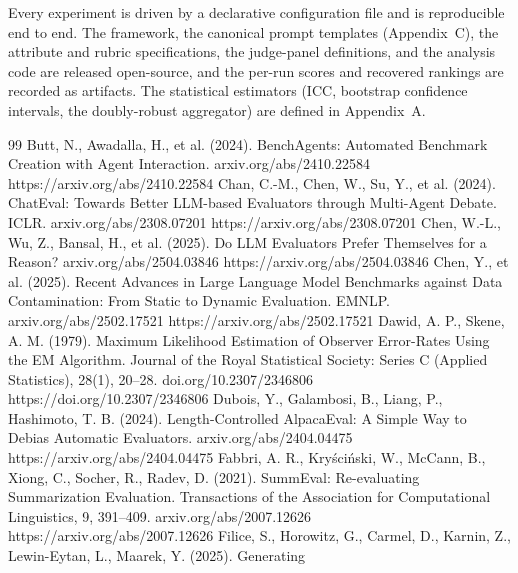 \documentclass[11pt,a4paper]{article}
\begin{document}
Every experiment is driven by a declarative configuration file and is reproducible end to end. The framework, the
canonical prompt templates (Appendix~C), the attribute and rubric specifications, the judge-panel definitions, and
the analysis code are released open-source, and the per-run scores and recovered rankings are recorded as artifacts. The
statistical estimators (ICC, bootstrap confidence intervals, the doubly-robust aggregator) are defined in
Appendix~A.



\begin{thebibliography}{99}
\setlength{\itemsep}{2pt plus 0.5pt}\setlength{\parsep}{0pt}
\label{r10} Butt, N., Awadalla, H., et al. (2024). BenchAgents: Automated Benchmark Creation with Agent
    Interaction. arxiv.org/abs/2410.22584 https://arxiv.org/abs/2410.22584
\label{r21} Chan, C.-M., Chen, W., Su, Y., et al. (2024). ChatEval: Towards Better LLM-based Evaluators through
    Multi-Agent Debate. ICLR. arxiv.org/abs/2308.07201 https://arxiv.org/abs/2308.07201
\label{r24} Chen, W.-L., Wu, Z., Bansal, H., et al. (2025). Do LLM Evaluators Prefer Themselves for a
    Reason? arxiv.org/abs/2504.03846 https://arxiv.org/abs/2504.03846
\label{r32} Chen, Y., et al. (2025). Recent Advances in Large Language Model Benchmarks against Data
    Contamination: From Static to Dynamic Evaluation. EMNLP. arxiv.org/abs/2502.17521 https://arxiv.org/abs/2502.17521
\label{r33} Dawid, A. P., Skene, A. M. (1979). Maximum Likelihood Estimation of Observer Error-Rates Using
    the EM Algorithm. Journal of the Royal Statistical Society: Series C (Applied Statistics), 28(1), 20–28. doi.org/10.2307/2346806 https://doi.org/10.2307/2346806
\label{r8} Dubois, Y., Galambosi, B., Liang, P., Hashimoto, T. B. (2024). Length-Controlled AlpacaEval: A Simple
    Way to Debias Automatic Evaluators. arxiv.org/abs/2404.04475 https://arxiv.org/abs/2404.04475
\label{r37} Fabbri, A. R., Kryściński, W., McCann, B., Xiong, C., Socher, R., Radev, D. (2021). SummEval: Re-evaluating Summarization Evaluation. Transactions of the Association for Computational
    Linguistics, 9, 391–409. arxiv.org/abs/2007.12626 https://arxiv.org/abs/2007.12626
\label{r31} Filice, S., Horowitz, G., Carmel, D., Karnin, Z., Lewin-Eytan, L., Maarek, Y. (2025). Generating

\end{thebibliography}
\end{document}
